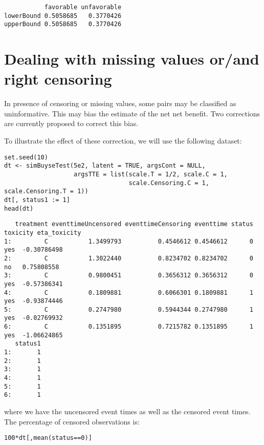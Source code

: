 \documentclass[12pt]{article}
\begin{document}
\begin{verbatim}
           favorable unfavorable
lowerBound 0.5058685   0.3770426
upperBound 0.5058685   0.3770426
\end{verbatim}

\clearpage

\section{Dealing with missing values or/and right censoring}
\label{sec:org90f58a0}

In presence of censoring or missing values, some pairs may be
classified as uninformative. This may bias the estimate of the net net
benefit. Two corrections are currently proposed to correct this bias.

\bigskip

To illustrate the effect of these correction, we will use the
following dataset:
\lstset{language=r,label= ,caption= ,captionpos=b,numbers=none}
\begin{lstlisting}
set.seed(10)
dt <- simBuyseTest(5e2, latent = TRUE, argsCont = NULL,
				   argsTTE = list(scale.T = 1/2, scale.C = 1,
								  scale.Censoring.C = 1, scale.Censoring.T = 1))
dt[, status1 := 1]
head(dt)
\end{lstlisting}

\begin{verbatim}
   treatment eventtimeUncensored eventtimeCensoring eventtime status toxicity eta_toxicity
1:         C           1.3499793          0.4546612 0.4546612      0      yes  -0.30786498
2:         C           1.3022440          0.8234702 0.8234702      0       no   0.75808558
3:         C           0.9800451          0.3656312 0.3656312      0      yes  -0.57386341
4:         C           0.1809881          0.6066301 0.1809881      1      yes  -0.93874446
5:         C           0.2747980          0.5944344 0.2747980      1      yes  -0.02769932
6:         C           0.1351895          0.7215782 0.1351895      1      yes  -1.06624865
   status1
1:       1
2:       1
3:       1
4:       1
5:       1
6:       1
\end{verbatim}

where we have the uncensored event times as well as the censored event
times. The percentage of censored observations is:
\lstset{language=r,label= ,caption= ,captionpos=b,numbers=none}
\begin{lstlisting}
100*dt[,mean(status==0)]
\end{lstlisting}
\end{document}
